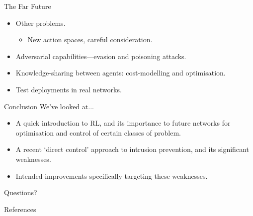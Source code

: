 \documentclass[aspectratio=169,xcolor={dvipsnames}
,hide notes
]{beamer}
\begin{document}
\begin{frame}{The Far Future}
\begin{itemize}
	\item Other problems.
	\begin{itemize}
		\item New action spaces, careful consideration.
	\end{itemize}
\item Adversarial capabilities---evasion and poisoning attacks.
\item Knowledge-sharing between agents: cost-modelling and optimisation.
\item Test deployments in real networks.
\end{itemize}
\end{frame}

\begin{frame}[standout]{Conclusion}
	We've looked at...
	\begin{itemize}
		\item A quick introduction to RL, and its \alert{importance to future networks} for optimisation and control of certain classes of problem.
		\item A recent `direct control' approach to intrusion prevention, and \alert{its significant weaknesses}.
		\item \alert{Intended improvements} specifically targeting these weaknesses.
	\end{itemize}
	
	\alert{Questions?}
\end{frame}

\appendix

\begin{frame}[allowframebreaks]{References}
\printbibliography[heading=none]
\end{frame}
\end{document}
